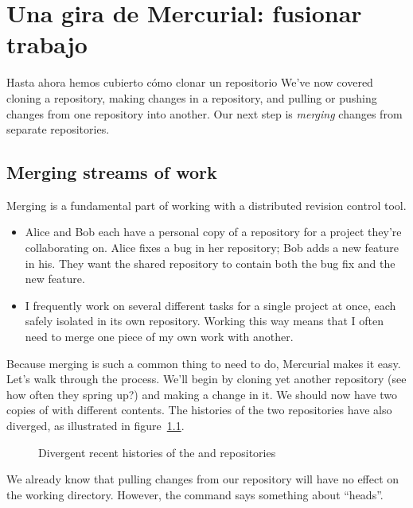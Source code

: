 \chapter{Una gira de Mercurial: fusionar trabajo}
\label{chap:tour-merge}

Hasta ahora hemos cubierto cómo clonar un repositorio
We've now covered cloning a repository, making changes in a
repository, and pulling or pushing changes from one repository into
another.  Our next step is \emph{merging} changes from separate
repositories.

\section{Merging streams of work}

Merging is a fundamental part of working with a distributed revision
control tool.
\begin{itemize}
\item Alice and Bob each have a personal copy of a repository for a
  project they're collaborating on.  Alice fixes a bug in her
  repository; Bob adds a new feature in his.  They want the shared
  repository to contain both the bug fix and the new feature.
\item I frequently work on several different tasks for a single
  project at once, each safely isolated in its own repository.
  Working this way means that I often need to merge one piece of my
  own work with another.
\end{itemize}

Because merging is such a common thing to need to do, Mercurial makes
it easy.  Let's walk through the process.  We'll begin by cloning yet
another repository (see how often they spring up?) and making a change
in it.
We should now have two copies of  with different
contents.  The histories of the two repositories have also diverged,
as illustrated in figure~\ref{fig:tour-merge:sep-repos}.

\begin{figure}[ht]
  \centering
  \caption{Divergent recent histories of the  and
     repositories}
  \label{fig:tour-merge:sep-repos}
\end{figure}

We already know that pulling changes from our 
repository will have no effect on the working directory.
However, the  command says something about ``heads''.  


